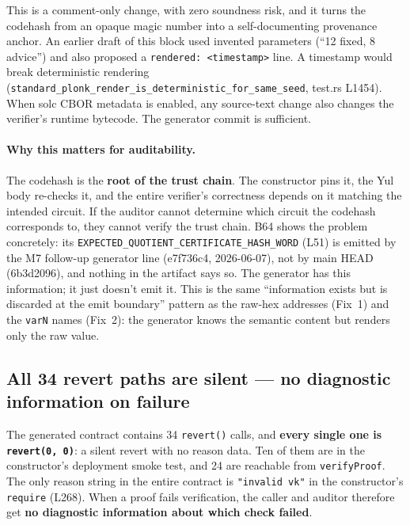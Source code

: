 This is a comment-only change, with zero soundness risk, and it
turns the codehash from an opaque magic number into a
self-documenting provenance anchor.  An earlier
draft of this block used invented parameters (``12 fixed, 8
advice'') and also proposed a \texttt{rendered: <timestamp>} line.
A timestamp would break deterministic rendering
(\texttt{standard\_\allowbreak{}plonk\_\allowbreak{}render\_\allowbreak{}is\_\allowbreak{}deterministic\_\allowbreak{}for\_\allowbreak{}same\_\allowbreak{}seed},
test.rs L1454). When solc CBOR metadata is enabled, any
source-text change also changes the verifier's runtime bytecode.
The generator commit is sufficient.

\paragraph{Why this matters for auditability.} The codehash is the
\textbf{root of the trust chain}. The constructor pins it, the Yul
body re-checks it, and the entire verifier's correctness depends on
it matching the intended circuit. If the auditor cannot determine
which circuit the codehash corresponds to, they cannot verify the
trust chain. B64 shows the problem concretely: its
\texttt{EXPECTED\_\allowbreak{}QUOTIENT\_\allowbreak{}CERTIFICATE\_\allowbreak{}HASH\_\allowbreak{}WORD} (L51) is emitted
by the M7 follow-up generator line (e7f736c4, 2026-06-07), not by
main HEAD (6b3d2096), and nothing in the artifact says so. The generator has
this information; it just doesn't emit it. This is the same
``information exists but is discarded at the emit boundary''
pattern as the raw-hex addresses (Fix~1) and the \texttt{varN}
names (Fix~2): the generator knows the semantic content but
renders only the raw value.

\subsection{All 34 revert paths are silent --- no diagnostic information on failure}
\label{sec:pr-silent-reverts}

The generated contract contains 34 \texttt{revert()} calls, and
\textbf{every single one is \texttt{revert(0, 0)}}: a silent revert
with no reason data. Ten of them are in the constructor's
deployment smoke test, and 24 are reachable from
\texttt{verifyProof}. The only reason string in the entire contract
is \texttt{"invalid vk"} in the constructor's \texttt{require}
(L268). When a proof fails verification, the caller and auditor
therefore get \textbf{no diagnostic information about which check
failed}.

